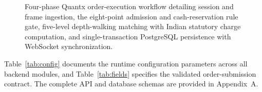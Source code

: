 \documentclass[journal,onecolumn,10pt]{IEEEtran}
\begin{document}
\begin{figure}[!t]
{}
\caption{Four-phase Quantx order-execution workflow detailing session and frame ingestion, the eight-point admission and cash-reservation rule gate, five-level depth-walking matching with Indian statutory charge computation, and single-transaction PostgreSQL persistence with WebSocket synchronization.}
\label{fig:phases}
\end{figure}

Table~\ref{tab:config} documents the runtime configuration parameters across all backend modules, and Table~\ref{tab:fields} specifies the validated order-submission contract. The complete API and database schemas are provided in Appendix~A.
\end{document}
